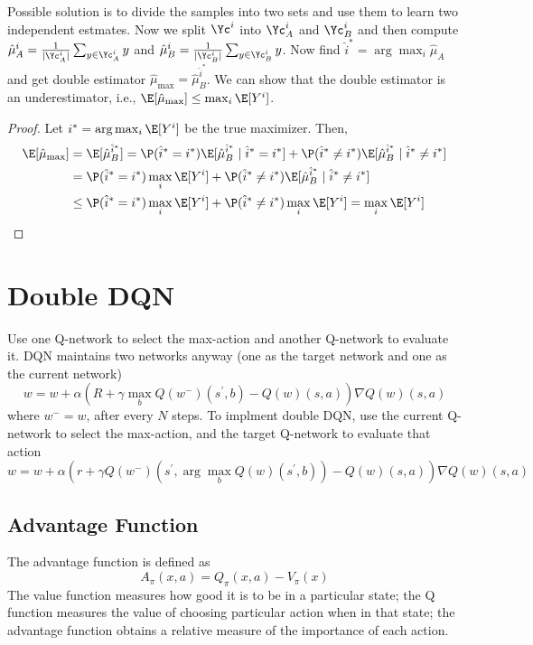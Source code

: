 \noindent Possible solution is to divide the samples into two sets and use them to learn two independent estmates. Now we split $\Yc^i$ into $\Yc_{A}^i$ and $\Yc_{B}^i$ and then compute $\hat{\mu}_{A}^i = \frac{1}{|\Yc_{A}^i|} \sum_{y\in\Yc_{A}^i} y$ and $\hat{\mu}_{B}^i = \frac{1}{|\Yc_{B}^i|} \sum_{y\in\Yc_{B}^i} y$. Now find $\hat{i}^* = \arg\max_{i}\hat{\mu}_{A}$ and get double estimator $\hat{\mu}_\text{max} = \hat{\mu}_B^{\hat{i}^*}$. We can show that the double estimator is an underestimator, i.e., $\E[\hat{\mu}_{\text{max}}] \leq \max_{i} \E[Y^i]$.
\begin{proof}
  Let $i^* = \arg\max_{i} \E[Y^i]$ be the true maximizer. Then,
  \begin{align*}
    \E[\hat{\mu}_{\text{max}}] &= \E[\hat{\mu}_B^{\hat{i}^*}] = \P(\hat{i}^* = i^*) \E[\hat{\mu}_{B}^{\hat{i}^*} \mid \hat{i}^* = i^*] + \P(\hat{i}^* \neq i^*) \E[\hat{\mu}_{B}^{\hat{i}^*} \mid \hat{i}^* \neq i^*] \\
                               &= \P(\hat{i}^* = i^*) \max_{i} \E[Y^i] + \P(\hat{i}^* \neq i^*) \E[\hat{\mu}_{B}^{\hat{i}^*} \mid \hat{i}^* \neq i^*] \\ 
                               &\leq \P(\hat{i}^* = i^*) \max_{i} \E[Y^i] + \P(\hat{i}^* \neq i^*) \max_{i} \E[Y^i] = \max_{i} \E[Y^i]
  \end{align*}
\end{proof}
\section{Double DQN}
Use one Q-network to select the max-action and another Q-network to evaluate it. DQN maintains two networks anyway (one as the target 
network and one as the current network)
\[
  w = w + \alpha(R + \gamma \max_{b}Q(w^-)(s^{\prime}, b) - Q(w)(s,a)) \nabla Q(w)(s,a) 
\]
where $w^- = w$, after every $N$ steps. To implment double DQN, use the current Q-network to select the max-action, and the target 
Q-network to evaluate that action 
\[
  w = w + \alpha(r + \gamma Q(w^-)(s^{\prime}, \arg\max_{b} Q(w)(s^{\prime}, b)) - Q(w)(s,a)) \nabla Q(w)(s,a) 
\] 

\subsection{Advantage Function}
The advantage function is defined as 
\[
 A_\pi (x,a) = Q_\pi (x,a) - V_\pi(x) 
\] 
The value function measures how good it is to be in a particular state; the Q function measures the value of choosing particular action when in that state; the advantage function obtains a relative measure of the importance of each action.
